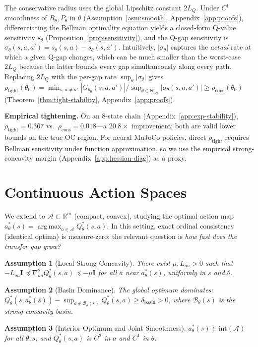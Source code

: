 \documentclass{article}
\newtheorem{assumption}{Assumption}
\newcommand{\R}{\mathbb{R}}
\newcommand{\cA}{\mathcal{A}}
\newcommand{\cB}{\mathcal{B}}
\DeclareMathOperator*{\argmax}{arg\,max}
\begin{document}
The conservative radius uses the global Lipschitz constant $2L_Q$. Under $C^1$ smoothness of $R_\theta, P_\theta$ in $\theta$ (Assumption~\ref{asm:smooth}, Appendix~\ref{app:proofs}), differentiating the Bellman optimality equation yields a closed-form Q-value sensitivity $\mathbf{s}_\theta$ (Proposition~\ref{prop:sensitivity}), and the Q-gap sensitivity is $\sigma_\theta(s,a,a') = s_\theta(s,a) - s_\theta(s,a')$. Intuitively, $|\sigma_\theta|$ captures the \emph{actual} rate at which a given Q-gap changes, which can be much smaller than the worst-case $2L_Q$ because the latter bounds every gap simultaneously along every path. Replacing $2L_Q$ with the per-gap rate $\sup_\theta|\sigma_\theta|$ gives $\rho_{\mathrm{tight}}(\theta_0) = \min_{s,\, a \neq a'} |G_{\theta_0}(s,a,a')|/\sup_{\theta \in \Theta_{\mathrm{reg}}}|\sigma_\theta(s,a,a')| \geq \rho_{\mathrm{cons}}(\theta_0)$ (Theorem~\ref{thm:tight-stability}, Appendix~\ref{app:proofs}).

\textbf{Empirical tightening.} On an 8-state chain (Appendix~\ref{app:exp-stability}), $\rho_{\mathrm{tight}} = 0.367$ vs.\ $\rho_{\mathrm{cons}} = 0.018$---a $20.8\times$ improvement; both are valid lower bounds on the true OC region. For neural MuJoCo policies, direct $\rho_{\mathrm{tight}}$ requires Bellman sensitivity under function approximation, so we use the empirical strong-concavity margin (Appendix~\ref{app:hessian-diag}) as a proxy.

\section{Continuous Action Spaces}
\label{sec:continuous}

We extend to $\cA \subset \R^m$ (compact, convex), studying the optimal action map $a^*_\theta(s) = \argmax_{a \in \cA} Q^*_\theta(s,a)$. In this setting, exact ordinal consistency (identical optima) is measure-zero; the relevant question is \emph{how fast does the transfer gap grow?}

\begin{assumption}[Local Strong Concavity]
\label{asm:local-sc}
There exist $\mu, L_{aa} > 0$ such that $-L_{aa}\mathbf{I} \preceq \nabla^2_{aa}Q^*_\theta(s,a) \preceq -\mu\mathbf{I}$ for all $a$ near $a^*_\theta(s)$, uniformly in $s$ and $\theta$.
\end{assumption}
\begin{assumption}[Basin Dominance]
\label{asm:basin-dom}
The global optimum dominates: $Q^*_\theta(s, a^*_\theta(s)) - \sup_{a \notin \cB_\theta(s)} Q^*_\theta(s, a) \geq \delta_{\mathrm{basin}} > 0$, where $\cB_\theta(s)$ is the strong concavity basin.
\end{assumption}
\begin{assumption}[Interior Optimum and Joint Smoothness]
\label{asm:interior}
$a^*_\theta(s) \in \mathrm{int}(\cA)$ for all $\theta, s$, and $Q^*_\theta(s,a)$ is $C^2$ in $a$ and $C^1$ in $\theta$.
\end{assumption}
\end{document}
